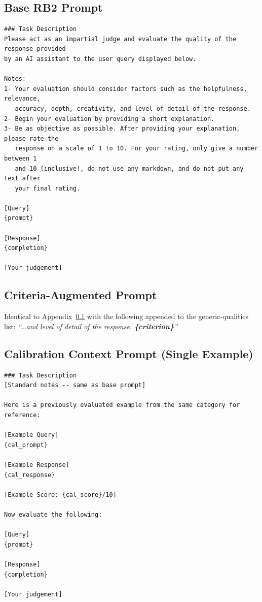 \documentclass{article}
\begin{document}
\subsection{Base RB2 Prompt}
\label{sec:prompt-base}

\begin{lstlisting}[style=prompt]
### Task Description
Please act as an impartial judge and evaluate the quality of the response provided
by an AI assistant to the user query displayed below.

Notes:
1- Your evaluation should consider factors such as the helpfulness, relevance,
   accuracy, depth, creativity, and level of detail of the response.
2- Begin your evaluation by providing a short explanation.
3- Be as objective as possible. After providing your explanation, please rate the
   response on a scale of 1 to 10. For your rating, only give a number between 1
   and 10 (inclusive), do not use any markdown, and do not put any text after
   your final rating.

[Query]
{prompt}

[Response]
{completion}

[Your judgement]
\end{lstlisting}

\subsection{Criteria-Augmented Prompt}
\label{sec:prompt-criteria}

Identical to Appendix~\ref{sec:prompt-base} with the following appended to the generic-qualities list: \emph{``\ldots and level of detail of the response. \textbf{\{criterion\}}''}

\subsection{Calibration Context Prompt (Single Example)}
\label{sec:prompt-cal-single}

\begin{lstlisting}[style=prompt]
### Task Description
[Standard notes -- same as base prompt]

Here is a previously evaluated example from the same category for reference:

[Example Query]
{cal_prompt}

[Example Response]
{cal_response}

[Example Score: {cal_score}/10]

Now evaluate the following:

[Query]
{prompt}

[Response]
{completion}

[Your judgement]
\end{lstlisting}
\end{document}
